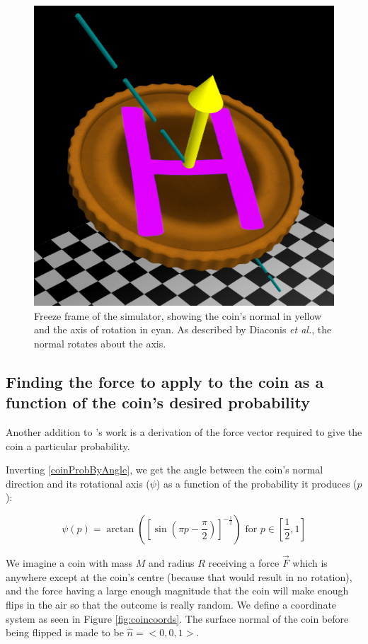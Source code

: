 \documentclass[english,12pt,a4paper,final]{article}
\begin{document}
\begin{figure}[H]
	\centering
	\includegraphics[width=0.7\linewidth]{flippingCoin}
	\caption{Freeze frame of the simulator, showing the coin's normal in yellow and the axis of rotation in cyan. As described by Diaconis \textit{et al.}, the normal rotates about the axis.}
	\label{fig:flippingcoin}
\end{figure}

\subsection{Finding the force to apply to the coin as a function of the coin's desired probability}

Another addition to \textcite{unfairCoin}'s work is a derivation of the force vector required to give the coin a particular probability.

Inverting \eqref{coinProbByAngle}, we get the angle between the coin's normal direction and its rotational axis ($\psi$) as a function of the probability it produces ($p$):

\begin{equation}\label{coinAngleByProb}
	\psi(p) = \arctan\left(\left[\sin(\pi p-\frac{\pi}{2})\right]^{-\frac{1}{2}}\right) \text{ for } p \in \left[\frac{1}{2}, 1\right]
\end{equation}

We imagine a coin with mass $M$ and radius $R$ receiving a force $\vec{F}$ which is anywhere except at the coin's centre (because that would result in no rotation), and the force having a large enough magnitude that the coin will make enough flips in the air so that the outcome is really random. We define a coordinate system as seen in Figure \ref{fig:coincoords}. The surface normal of the coin before being flipped is made to be $\hat{n} = <0, 0, 1>$.
\end{document}
